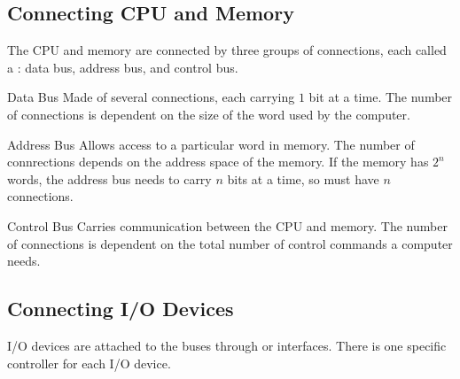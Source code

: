 \documentclass[../notes.tex]{subfiles}
\begin{document}
			\subsection{Connecting CPU and Memory}
				The CPU and memory are connected by three groups of connections, each called a : data bus, address bus, and control bus.
					\begin{definition}{Data Bus}
						Made of several connections, each carrying $1$ bit at a time. The number of connections is dependent on the size of the word used by the computer.
					\end{definition}
					\begin{definition}{Address Bus}
						Allows access to a particular word in memory. The number of connrections depends on the address space of the memory. If the memory has $2^{n}$ words, the address bus needs to carry $n$ bits at a time, so must have $n$ connections.
					\end{definition}
					\begin{definition}{Control Bus}
						Carries communication between the CPU and memory. The number of connections is dependent on the total number of control commands a computer needs.
					\end{definition}
			\pagebreak
			\subsection{Connecting I/O Devices}
				I/O devices are attached to the buses through  or interfaces. There is one specific controller for each I/O device.
\end{document}
